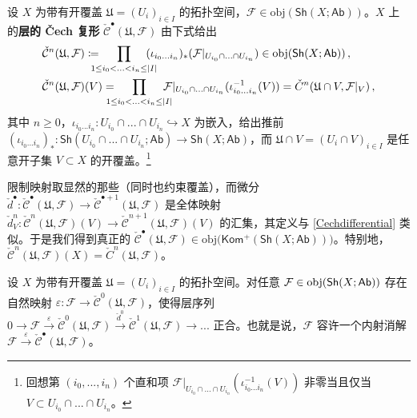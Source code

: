 \begin{Def}
设 $X$ 为带有开覆盖 $\mathfrak{U}=(U_i)_{i\in I}$ 的拓扑空间，$\mathcal{F}\in\text{obj}(\mathsf{Sh}(X;\mathsf{Ab}))$。$X$ 上的\textbf{层的 \v{C}ech 复形} $\check{\mathcal{C}}^\bullet(\mathfrak{U},\mathcal{F})$ 由下式给出
\begin{equation}
	\begin{aligned}
		&\check{\mathcal{C}}^n(\mathfrak{U},\mathcal{F})\coloneqq\mkern-18mu\prod_{\begin{small}1\leq i_0<...<i_n\leq |I|\end{small}}\mkern-18mu (\iota_{i_0...i_n})_*(\mathcal{F}|_{U_{i_0}\cap...\cap U_{i_n}})\in\text{obj}(\mathsf{Sh}(X;\mathsf{Ab}))\,, \\
		&\check{\mathcal{C}}^n(\mathfrak{U},\mathcal{F})(V)= \mkern-18mu\prod_{\begin{small}1\leq i_0<...<i_n\leq |I|\end{small}}\mkern-18mu \mathcal{F}|_{U_{i_0}\cap...\cap U_{i_n}}(\iota_{i_0...i_n}^{-1}(V))=\check{C}^n(\mathfrak{U}\cap V,\mathcal{F}|_V)\,,
	\end{aligned}
\end{equation}
其中 $n\geq 0$，$\iota_{i_0...i_n}:U_{i_0}\cap...\cap U_{i_n}\hookrightarrow X$ 为嵌入，给出推前 $(\iota_{i_0...i_n})_*:\mathsf{Sh}(U_{i_0}\cap...\cap U_{i_n};\mathsf{Ab})\rightarrow\mathsf{Sh}(X;\mathsf{Ab})$，而 $\mathfrak{U}\cap V=(U_i\cap V)_{i\in I}$ 是任意开子集 $V\subset X$ 的开覆盖。\footnote{回想第 $(i_0,...,i_n)$ 个直和项 $\mathcal{F}|_{U_{i_0}\cap...\cap U_{i_n}}(\iota_{i_0...i_n}^{-1}(V))$ 非零当且仅当 $V\subset U_{i_0}\cap...\cap U_{i_n}$。}

限制映射取显然的那些（同时也约束覆盖），而微分 $\check{d}^\bullet:\check{\mathcal{C}}^\bullet(\mathfrak{U},\mathcal{F})\rightarrow \check{\mathcal{C}}^{\bullet+1}(\mathfrak{U},\mathcal{F})$ 是全体映射 $\check{d}_V^n:\check{\mathcal{C}}^n(\mathfrak{U},\mathcal{F})(V)\rightarrow \check{\mathcal{C}}^{n+1}(\mathfrak{U},\mathcal{F})(V)$ 的汇集，其定义与 \eqref{Cechdifferential} 类似。于是我们得到真正的 $\check{\mathcal{C}}^\bullet(\mathfrak{U},\mathcal{F})\in\text{obj}\big(\mathsf{Kom^+}(\mathsf{Sh}(X;\mathsf{Ab}))\big)$。特别地，$\check{\mathcal{C}}^n(\mathfrak{U},\mathcal{F})(X)=\check{C}^n(\mathfrak{U},\mathcal{F})$。  
\end{Def}

\begin{Lem}\label{Cechinjres}
设 $X$ 为带有开覆盖 $\mathfrak{U}=(U_i)_{i\in I}$ 的拓扑空间。对任意 $\mathcal{F}\in\textup{obj}(\mathsf{Sh}(X;\mathsf{Ab}))$ 存在自然映射 $\varepsilon:\mathcal{F}\rightarrow \check{\mathcal{C}}^0(\mathfrak{U},\mathcal{F})$，使得层序列 $0\rightarrow\mathcal{F}\xrightarrow{\varepsilon}\check{\mathcal{C}}^0(\mathfrak{U},\mathcal{F})\xrightarrow{\check{d}^0}\check{\mathcal{C}}^1(\mathfrak{U},\mathcal{F})\rightarrow...$ 正合。也就是说，$\mathcal{F}$ 容许一个内射消解 $\mathcal{F}\xrightarrow{\varepsilon}\check{\mathcal{C}}^\bullet(\mathfrak{U},\mathcal{F})$。
\end{Lem}

